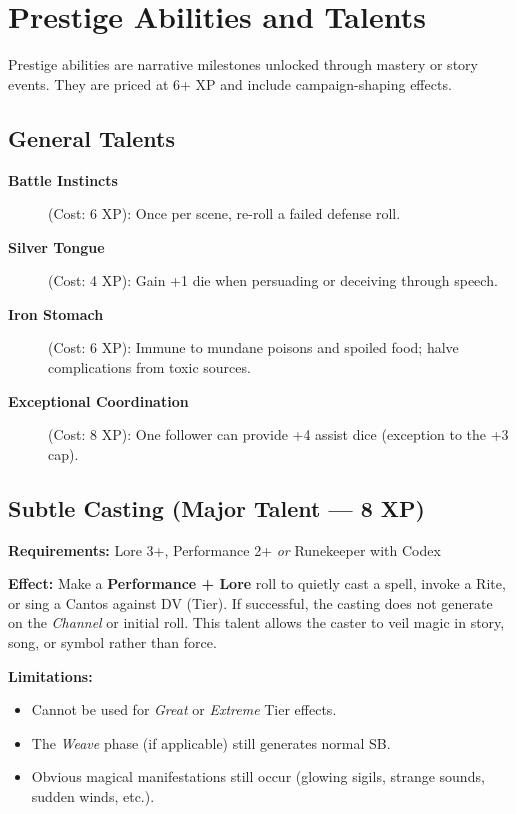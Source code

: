 \section{Prestige Abilities and Talents}
\label{sec:prestige-abilities}

Prestige abilities are narrative milestones unlocked through mastery or story events. They are priced at 6+ XP and include campaign-shaping effects. 

\subsection{General Talents}
\label{subsec:general-talents}

\begin{description}
\item[\textbf{Battle Instincts}] (Cost: 6 XP): Once per scene, re-roll a failed defense roll.
\item[\textbf{Silver Tongue}] (Cost: 4 XP): Gain +1 die when persuading or deceiving through speech.
\item[\textbf{Iron Stomach}] (Cost: 6 XP): Immune to mundane poisons and spoiled food; halve complications from toxic sources.
\item[\textbf{Exceptional Coordination}] (Cost: 8 XP): One follower can provide +4 assist dice (exception to the +3 cap).
\end{description}

\subsection*{Subtle Casting (Major Talent --- 8 XP)}

\textbf{Requirements:} Lore 3+, Performance 2+ \emph{or} Runekeeper with Codex

\textbf{Effect:} Make a \textbf{Performance + Lore} roll to quietly cast a spell, invoke a Rite, or sing a Cantos against DV (Tier). 
If successful, the casting does not generate  on the \emph{Channel} or initial roll. 
This talent allows the caster to veil magic in story, song, or symbol rather than force.

\textbf{Limitations:}
\begin{itemize}
  \item Cannot be used for \emph{Great} or \emph{Extreme} Tier effects.
  \item The \emph{Weave} phase (if applicable) still generates normal SB.
  \item Obvious magical manifestations still occur (glowing sigils, strange sounds, sudden winds, etc.).
\end{itemize}


